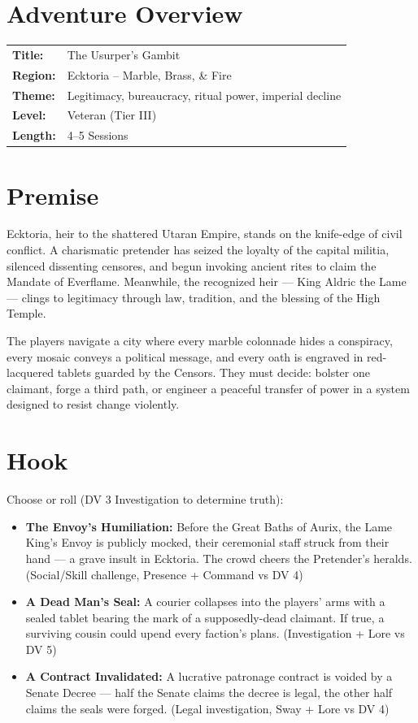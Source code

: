 \documentclass[11pt]{article}
\begin{document}




\section*{Adventure Overview}

\begin{tabularx}{\textwidth}{@{}lX@{}}
\textbf{Title:} & The Usurper's Gambit \\
\textbf{Region:} & Ecktoria -- Marble, Brass, \& Fire \\
\textbf{Theme:} & Legitimacy, bureaucracy, ritual power, imperial decline \\
\textbf{Level:} & Veteran (Tier III) \\
\textbf{Length:} & 4--5 Sessions \\
\end{tabularx}


\section{Premise}

Ecktoria, heir to the shattered Utaran Empire, stands on the knife-edge of civil conflict. A charismatic pretender has seized the loyalty of the capital militia, silenced dissenting censores, and begun invoking ancient rites to claim the Mandate of Everflame. Meanwhile, the recognized heir --- King Aldric the Lame --- clings to legitimacy through law, tradition, and the blessing of the High Temple.

The players navigate a city where every marble colonnade hides a conspiracy, every mosaic conveys a political message, and every oath is engraved in red-lacquered tablets guarded by the Censors. They must decide: bolster one claimant, forge a third path, or engineer a peaceful transfer of power in a system designed to resist change violently.

\section{Hook}

Choose or roll (DV 3 Investigation to determine truth):
\begin{itemize}
\item \textbf{The Envoy's Humiliation:} Before the Great Baths of Aurix, the Lame King's Envoy is publicly mocked, their ceremonial staff struck from their hand --- a grave insult in Ecktoria. The crowd cheers the Pretender's heralds. (Social/Skill challenge, Presence + Command vs DV 4)
\item \textbf{A Dead Man's Seal:} A courier collapses into the players' arms with a sealed tablet bearing the mark of a supposedly-dead claimant. If true, a surviving cousin could upend every faction's plans. (Investigation + Lore vs DV 5)
\item \textbf{A Contract Invalidated:} A lucrative patronage contract is voided by a Senate Decree --- half the Senate claims the decree is legal, the other half claims the seals were forged. (Legal investigation, Sway + Lore vs DV 4)
\end{itemize}
\end{document}
